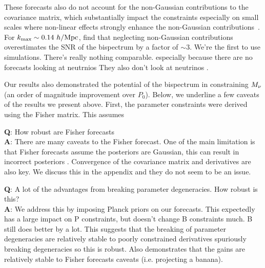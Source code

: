 These forecasts also do not account for the 
non-Gaussian contributions to the covariance matrix, which substantially impact the
constraints especially on small scales where non-linear effects strongly enhance 
the non-Gaussian contributions~\citep{chan2017}. For $k_{\rm max} \sim 0.14~h/{\rm Mpc}$, 
\cite{chan2017} find that neglecting non-Gaussian contributions overestimates the 
SNR of the bispectrum by a factor of $\sim 3$. 
We're the first to use simulations. There's really nothing comparable. especially because there are no forecasts looking at neutrnios
They also don't look at neutrinos\cite{ruggeri2018} . 

Our results also demonstrated the potential of 
the bispectrum in constraining $M_\nu$ (an order of magnitude improvement over 
$P_0$). Below, we underline a few caveats of the results we present above. 
First, the parameter constraints were derived using the Fisher matrix. This 
assumes 

{\bf Q}: How robust are Fisher forecasts \\ 
{\bf A}: There are many caveats to the Fisher forecast. One of the main limitation is that 
Fisher forecasts assume the posteriors are Gaussian, this can result in incorrect posteriors \cite{wolz2012}. 
Convergence of the covariance matrix and derivatives are also key. We discuss this in the appendix
and they do not seem to be an issue. 

{\bf Q}: A lot of the advantages from breaking parameter degeneracies. How robust is this? \\
{\bf A}: We address this by imposing Planck priors on our forecasts. This expectedly has a 
large impact on P constraints, but doesn't change B constraints much. B still does better 
by a lot. This suggests that the breaking of parameter degeneracies are relatively stable 
to poorly constrained derivatives spuriously breaking degeneracies so this is robust. Also 
demonstrates that the gains are relatively stable to Fisher forecasts caveats 
(i.e. projecting a banana). 

